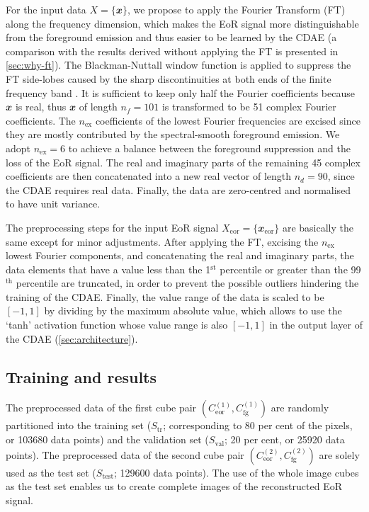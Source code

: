\documentclass[fleqn,usenatbib]{mnras}
\newcommand{\R}[1]{\mathrm{#1}}
\newcommand{\B}[1]{\mathbfit{#1}}
\newcommand{\editone}[1]{{\leavevmode\color{cyan}#1}}
\begin{document}
For the input data $X = \{\B{x}\}$, we propose to apply the
Fourier Transform (FT) along the frequency dimension,
which makes the EoR signal more distinguishable from the
foreground emission and thus easier to be learned by the CDAE
(a comparison with the results derived without applying the FT is
presented in \autoref{sec:why-ft}).
The Blackman-Nuttall window function is applied to suppress the
FT side-lobes caused by the sharp discontinuities at both ends
of the finite frequency band \citep[e.g.,][]{chapman2016}.
It is sufficient to keep only half the Fourier coefficients because
$\B{x}$ is real, thus $\B{x}$ of length $n_f = 101$ is transformed to
be 51 complex Fourier coefficients.
The $n_{\R{ex}}$ coefficients of the lowest Fourier frequencies are
excised since they are mostly contributed by the spectral-smooth
foreground emission.
We adopt $n_{\R{ex}} = 6$ to achieve a balance between the foreground
suppression and the loss of the EoR signal.
The real and imaginary parts of the remaining 45 complex coefficients
are then concatenated into a new real vector of length $n_d = 90$,
since the CDAE requires real data.
Finally, the data are zero-centred and normalised to have unit variance.

The preprocessing steps for the input EoR signal
$X_{\R{eor}} = \{\B{x}_{\R{eor}}\}$
are basically the same except for minor adjustments.
After applying the FT, excising the $n_{\R{ex}}$ lowest Fourier
components, and concatenating the real and imaginary parts,
the data elements that have a value less than the 1$^{\R{st}}$
percentile or greater than the 99$^{\R{th}}$ percentile are truncated,
in order to prevent the possible outliers hindering the training of
the CDAE.
Finally, the value range of the data is scaled to be $[-1, 1]$ by
dividing by the maximum absolute value,
which allows to use the `tanh' activation function whose value range
is also $[-1, 1]$ in the output layer of the CDAE
(\autoref{sec:architecture}).


\subsection{Training and results}
\label{sec:results}

\editone{%
The preprocessed data of the first cube pair
$\left( C_{\R{eor}}^{(1)}, C_{\R{fg}}^{(1)} \right)$
are randomly partitioned into the training set ($S_{\R{tr}}$; corresponding
to 80 per cent of the pixels, or \num{103680} data points) and the
validation set ($S_{\R{val}}$; 20 per cent, or \num{25920} data points).
The preprocessed data of the second cube pair
$\left( C_{\R{eor}}^{(2)}, C_{\R{fg}}^{(2)} \right)$
are solely used as the test set ($S_{\R{test}}$; \num{129600} data points).
The use of the whole image cubes as the test set enables us to create
complete images of the reconstructed EoR signal.
} %
\end{document}
